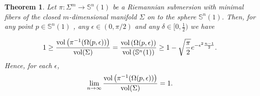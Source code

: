 \documentclass{amsart}
\newtheorem{theorem}{Theorem}[section]
\theoremstyle{definition}
\theoremstyle{remark}
\begin{document}
\begin{theorem}\label{TeoSub1}
Let  $\pi: \Sigma^m \to \mathbb{S}^n(1)$ be a Riemannian submersion with minimal fibers  of the closed $m$-dimensional manifold $\Sigma$ on to the sphere  $\mathbb{S}^n(1)$. Then, for any point $p \in \mathbb{S}^n(1)$ , any  $\epsilon \in (0,\pi/2)$ and any $\delta\in [0,\frac{1}{2})$ we have 

\begin{equation}
1\geq \frac{{\rm vol}\left(\pi^{-1}(\Omega(p,\epsilon))\right)}{{\rm vol}(\Sigma)}=\frac{{\rm vol}\left(\Omega(p,\epsilon)\right)}{{\rm vol}\left(\mathbb{S}^n(1)\right)}\geq  1-\sqrt{\frac{\pi}{2}}e^{-\epsilon^2\frac{n-1}{2}}.
\end{equation}
Hence, for each  $\epsilon$,
\begin{equation}
\lim_{n\to\infty}\frac{{\rm vol}\left(\pi^{-1}(\Omega(p,\epsilon))\right)}{{\rm vol}(\Sigma)}=1.
\end{equation}
\end{theorem}
\end{document}
